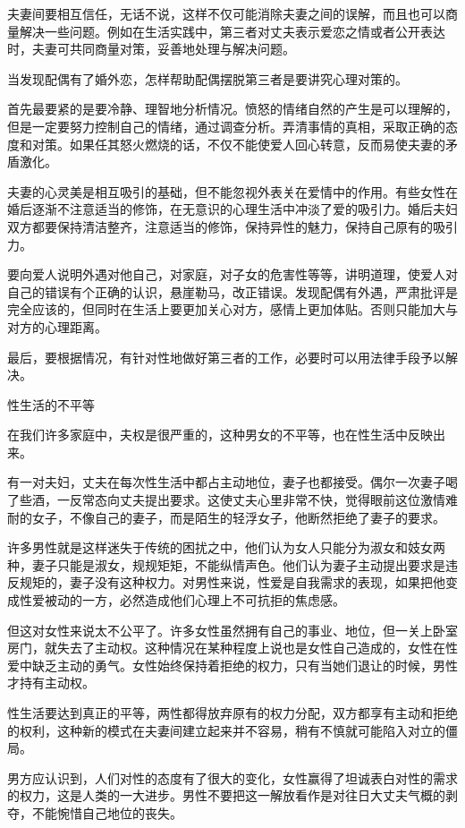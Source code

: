 \documentclass[12pt,UTF8,openany]{ctexbook}
\begin{document}
夫妻间要相互信任，无话不说，这样不仅可能消除夫妻之间的误解，而且也可以商量解决一些问题。例如在生活实践中，第三者对丈夫表示爱恋之情或者公开表达时，夫妻可共同商量对策，妥善地处理与解决问题。

当发现配偶有了婚外恋，怎样帮助配偶摆脱第三者是要讲究心理对策的。

首先最要紧的是要冷静、理智地分析情况。愤怒的情绪自然的产生是可以理解的，但是一定要努力控制自己的情绪，通过调查分析。弄清事情的真相，采取正确的态度和对策。如果任其怒火燃烧的话，不仅不能使爱人回心转意，反而易使夫妻的矛盾激化。

夫妻的心灵美是相互吸引的基础，但不能忽视外表关在爱情中的作用。有些女性在婚后逐渐不注意适当的修饰，在无意识的心理生活中冲淡了爱的吸引力。婚后夫妇双方都要保持清洁整齐，注意适当的修饰，保持异性的魅力，保持自己原有的吸引力。

要向爱人说明外遇对他自己，对家庭，对子女的危害性等等，讲明道理，使爱人对自己的错误有个正确的认识，悬崖勒马，改正错误。发现配偶有外遇，严肃批评是完全应该的，但同时在生活上要更加关心对方，感情上更加体贴。否则只能加大与对方的心理距离。

最后，要根据情况，有针对性地做好第三者的工作，必要时可以用法律手段予以解决。





性生活的不平等


在我们许多家庭中，夫权是很严重的，这种男女的不平等，也在性生活中反映出来。

有一对夫妇，丈夫在每次性生活中都占主动地位，妻子也都接受。偶尔一次妻子喝了些酒，一反常态向丈夫提出要求。这使丈夫心里非常不快，觉得眼前这位激情难耐的女子，不像自己的妻子，而是陌生的轻浮女子，他断然拒绝了妻子的要求。

许多男性就是这样迷失于传统的困扰之中，他们认为女人只能分为淑女和妓女两种，妻子只能是淑女，规规矩矩，不能纵情声色。他们认为妻子主动提出要求是违反规矩的，妻子没有这种权力。对男性来说，性爱是自我需求的表现，如果把他变成性爱被动的一方，必然造成他们心理上不可抗拒的焦虑感。

但这对女性来说太不公平了。许多女性虽然拥有自己的事业、地位，但一关上卧室房门，就失去了主动权。这种情况在某种程度上说也是女性自己造成的，女性在性爱中缺乏主动的勇气。女性始终保持着拒绝的权力，只有当她们退让的时候，男性才持有主动权。

性生活要达到真正的平等，两性都得放弃原有的权力分配，双方都享有主动和拒绝的权利，这种新的模式在夫妻间建立起来并不容易，稍有不慎就可能陷入对立的僵局。

男方应认识到，人们对性的态度有了很大的变化，女性赢得了坦诚表白对性的需求的权力，这是人类的一大进步。男性不要把这一解放看作是对往日大丈夫气概的剥夺，不能惋惜自己地位的丧失。
\end{document}
